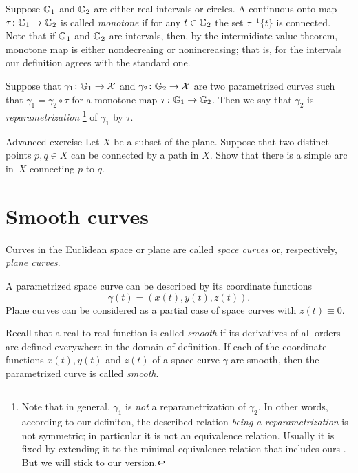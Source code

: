 Suppose $\mathbb{G}_1$ and $\mathbb{G}_2$ are either real intervals or circles.
A continuous onto map $\tau\colon\mathbb{G}_1\to\mathbb{G}_2$ is called \emph{monotone} if for any $t\in \mathbb{G}_2$ the set $\tau^{-1}\{t\}$ is connected.
Note that if $\mathbb{G}_1$ and $\mathbb{G}_2$ are intervals, then, by the intermidiate value theorem, monotone map is either nondecreaing or nonincreasing;
that is, for the intervals our definition agrees with the standard one.

Suppose that $\gamma_1\colon\mathbb{G}_1\to \mathcal{X}$ and $\gamma_2\colon\mathbb{G}_2\to \mathcal{X}$ are two parametrized curves such that 
$\gamma_1=\gamma_2\circ\tau$ for a monotone map $\tau\colon\mathbb{G}_1\to\mathbb{G}_2$.
Then we say that $\gamma_2$ is \emph{reparametrization}%
\footnote{Note that in general, $\gamma_1$ is {}\emph{not} a reparametrization of $\gamma_2$.
In other words, according to our definiton, the described relation {}\emph{being a reparametrization} is not symmetric;
in particular it is not an equivalence relation.
Usually it is fixed by extending it to the minimal equivalence relation that includes ours \cite[2.5.1]{burago-burago-ivanov}.
But we will stick to our version.}
of $\gamma_1$
 by $\tau$.


\begin{thm}{Advanced exercise}\label{aex:simple-curve}
Let $X$ be a subset of the plane.
Suppose that two distinct points $p,q\in X$ can be connected by a path in $X$.
Show that there is a simple arc in~$X$ connecting $p$ to $q$.
\end{thm}

\section{Smooth curves}

Curves in the Euclidean space or plane are called \emph{space curves} or, respectively, \emph{plane curves}.

A parametrized space curve can be described by its coordinate functions 
\[\gamma(t)=(x(t),y(t),z(t)).\]
Plane curves can be considered as a partial case of space curves with $z(t)\equiv 0$.

Recall that a real-to-real function is called \emph{smooth} if its derivatives of all orders are defined everywhere in the domain of definition.  
If each of the coordinate functions $x(t), y(t)$ and $z(t)$ of a space curve $\gamma$ are smooth, then the parametrized curve is called \emph{smooth}.

